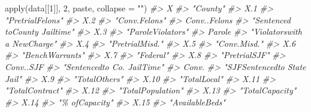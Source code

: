 \documentclass[
  12pt,
  openany]{book}
\newenvironment{Shaded}{\begin{snugshade}}{\end{snugshade}}
\newcommand{\AttributeTok}[1]{\textcolor[rgb]{0.61,0.61,0.61}{#1}}
\newcommand{\CommentTok}[1]{\textcolor[rgb]{0.37,0.37,0.37}{\textit{#1}}}
\newcommand{\DecValTok}[1]{\textcolor[rgb]{0.06,0.06,0.06}{#1}}
\newcommand{\FunctionTok}[1]{\textcolor[rgb]{0,0,0}{#1}}
\newcommand{\NormalTok}[1]{#1}
\newcommand{\StringTok}[1]{\textcolor[rgb]{0.5,0.5,0.5}{#1}}
\begin{document}
\begin{Shaded}
\begin{Highlighting}[]
\FunctionTok{apply}\NormalTok{(data[[}\DecValTok{1}\NormalTok{]], }\DecValTok{2}\NormalTok{, paste, }\AttributeTok{collapse =} \StringTok{""}\NormalTok{)}
\CommentTok{\#\textgreater{}                             X }
\CommentTok{\#\textgreater{}                      "County" }
\CommentTok{\#\textgreater{}                           X.1 }
\CommentTok{\#\textgreater{}              "PretrialFelons" }
\CommentTok{\#\textgreater{}                           X.2 }
\CommentTok{\#\textgreater{}                 "Conv.Felons" }
\CommentTok{\#\textgreater{}                  Conv..Felons }
\CommentTok{\#\textgreater{} "Sentenced toCounty Jailtime" }
\CommentTok{\#\textgreater{}                           X.3 }
\CommentTok{\#\textgreater{}             "ParoleViolators" }
\CommentTok{\#\textgreater{}                        Parole }
\CommentTok{\#\textgreater{}   "Violatorswith a NewCharge" }
\CommentTok{\#\textgreater{}                           X.4 }
\CommentTok{\#\textgreater{}               "PretrialMisd." }
\CommentTok{\#\textgreater{}                           X.5 }
\CommentTok{\#\textgreater{}                  "Conv.Misd." }
\CommentTok{\#\textgreater{}                           X.6 }
\CommentTok{\#\textgreater{}               "BenchWarrants" }
\CommentTok{\#\textgreater{}                           X.7 }
\CommentTok{\#\textgreater{}                     "Federal" }
\CommentTok{\#\textgreater{}                           X.8 }
\CommentTok{\#\textgreater{}                 "PretrialSJF" }
\CommentTok{\#\textgreater{}                     Conv..SJF }
\CommentTok{\#\textgreater{}    "Sentencedto Co. JailTime" }
\CommentTok{\#\textgreater{}                         Conv. }
\CommentTok{\#\textgreater{}   "SJFSentencedto State Jail" }
\CommentTok{\#\textgreater{}                           X.9 }
\CommentTok{\#\textgreater{}                 "TotalOthers" }
\CommentTok{\#\textgreater{}                          X.10 }
\CommentTok{\#\textgreater{}                  "TotalLocal" }
\CommentTok{\#\textgreater{}                          X.11 }
\CommentTok{\#\textgreater{}               "TotalContract" }
\CommentTok{\#\textgreater{}                          X.12 }
\CommentTok{\#\textgreater{}             "TotalPopulation" }
\CommentTok{\#\textgreater{}                          X.13 }
\CommentTok{\#\textgreater{}               "TotalCapacity" }
\CommentTok{\#\textgreater{}                          X.14 }
\CommentTok{\#\textgreater{}                "\% ofCapacity" }
\CommentTok{\#\textgreater{}                          X.15 }
\CommentTok{\#\textgreater{}               "AvailableBeds"}
\end{Highlighting}
\end{Shaded}
\end{document}
